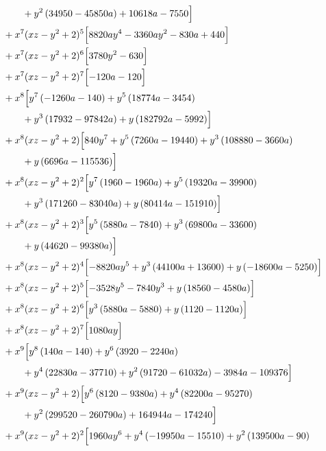 \begin{align*}
&\qquad + y^{2} \left(34950 - 45850 a\right) + 10618 a - 7550\Bigr]\\
&{}+x^{7}(xz-y^2+2)^{5}\Bigl[8820 a y^{4} - 3360 a y^{2} - 830 a + 440\Bigr]\\
&{}+x^{7}(xz-y^2+2)^{6}\Bigl[3780 y^{2} - 630\Bigr]\\
&{}+x^{7}(xz-y^2+2)^{7}\Bigl[- 120 a - 120\Bigr]\\
&{}+x^{8}\Bigl[y^{7} \left(- 1260 a - 140\right) + y^{5} \left(18774 a - 3454\right)\\
&\qquad + y^{3} \left(17932 - 97842 a\right) + y \left(182792 a - 5992\right)\Bigr]\\
&{}+x^{8}(xz-y^2+2)\Bigl[840 y^{7} + y^{5} \left(7260 a - 19440\right) + y^{3} \left(108880 - 3660 a\right)\\
&\qquad + y \left(6696 a - 115536\right)\Bigr]\\
&{}+x^{8}(xz-y^2+2)^{2}\Bigl[y^{7} \left(1960 - 1960 a\right) + y^{5} \left(19320 a - 39900\right)\\
&\qquad + y^{3} \left(171260 - 83040 a\right) + y \left(80414 a - 151910\right)\Bigr]\\
&{}+x^{8}(xz-y^2+2)^{3}\Bigl[y^{5} \left(5880 a - 7840\right) + y^{3} \left(69800 a - 33600\right)\\
&\qquad + y \left(44620 - 99380 a\right)\Bigr]\\
&{}+x^{8}(xz-y^2+2)^{4}\Bigl[- 8820 a y^{5} + y^{3} \left(44100 a + 13600\right) + y \left(- 18600 a - 5250\right)\Bigr]\\
&{}+x^{8}(xz-y^2+2)^{5}\Bigl[- 3528 y^{5} - 7840 y^{3} + y \left(18560 - 4580 a\right)\Bigr]\\
&{}+x^{8}(xz-y^2+2)^{6}\Bigl[y^{3} \left(5880 a - 5880\right) + y \left(1120 - 1120 a\right)\Bigr]\\
&{}+x^{8}(xz-y^2+2)^{7}\Bigl[1080 a y\Bigr]\\
&{}+x^{9}\Bigl[y^{8} \left(140 a - 140\right) + y^{6} \left(3920 - 2240 a\right)\\
&\qquad + y^{4} \left(22830 a - 37710\right) + y^{2} \left(91720 - 61032 a\right) - 3984 a - 109376\Bigr]\\
&{}+x^{9}(xz-y^2+2)\Bigl[y^{6} \left(8120 - 9380 a\right) + y^{4} \left(82200 a - 95270\right)\\
&\qquad + y^{2} \left(299520 - 260790 a\right) + 164944 a - 174240\Bigr]\\
&{}+x^{9}(xz-y^2+2)^{2}\Bigl[1960 a y^{6} + y^{4} \left(- 19950 a - 15510\right) + y^{2} \left(139500 a - 90\right)\\

\end{align*}

